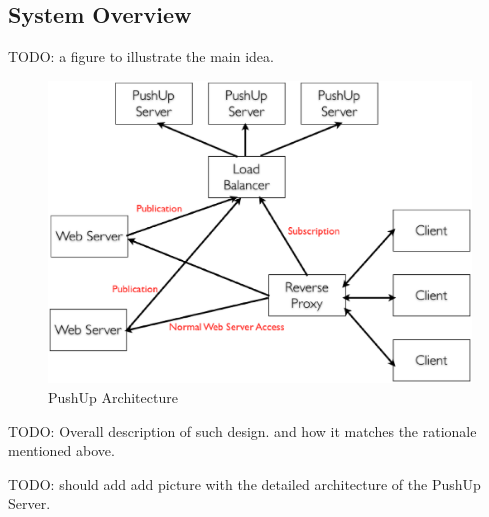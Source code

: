 \subsection{System Overview\\}

TODO: a figure to illustrate the main idea.

\begin{figure}[htb!]
\centering%
    \includegraphics[scale=0.30]{figures/pushup.eps}
    \caption{PushUp Architecture}
    \label{fig:eventloop}
\end{figure}

TODO: Overall description of such design. and how it matches the rationale mentioned above.

TODO: should add add picture with the detailed architecture of the PushUp Server.

